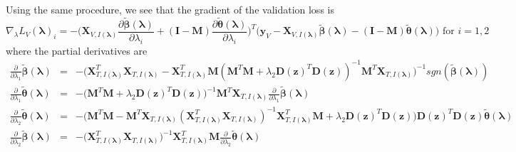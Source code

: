 \documentclass[10pt,letterpaper]{article}
\begin{document}
Using the same procedure, we see that the gradient of the validation loss is
\begin{equation*}
\nabla_\lambda L_V(\boldsymbol{\lambda})_i =
- \bigg(
\boldsymbol{X}_{V, I(\boldsymbol\lambda)} \frac{\partial \tilde{\boldsymbol\beta}(\boldsymbol{\lambda})}{\partial \lambda_i}
+ (\boldsymbol I - \boldsymbol{M}) \frac{\partial \tilde{\boldsymbol\theta}(\boldsymbol{\lambda})}{\partial \lambda_i}
\bigg )^T
\bigg (
\boldsymbol{y}_V
- \boldsymbol{X}_{V, I(\boldsymbol\lambda)} \tilde{\boldsymbol\beta}(\boldsymbol{\lambda})
- (\boldsymbol I - \boldsymbol{M}) \tilde{\boldsymbol\theta}(\boldsymbol{\lambda})
\bigg )
\text{ for } i = 1,2 
\end{equation*}
where the partial derivatives are
\begin{equation*}
\begin{array}{lcl}
\frac{\partial}{\partial \lambda_1} \tilde{\boldsymbol\beta}(\boldsymbol{\lambda})  &=&
-\bigg(\boldsymbol{X}_{T, I(\boldsymbol\lambda)}^T \boldsymbol{X}_{T, I(\boldsymbol\lambda)}
- \boldsymbol{X}_{T, I(\boldsymbol\lambda)}^T \boldsymbol{M}(\boldsymbol{M}^T \boldsymbol{M}
+ \lambda_2 \boldsymbol{D}(\boldsymbol{z})^T\boldsymbol{D}(\boldsymbol{z}))^{-1} \boldsymbol{M}^T \boldsymbol{X}_{T, I(\boldsymbol\lambda)} \bigg)^{-1} 
sgn( \tilde{\boldsymbol\beta}(\boldsymbol{\lambda})) \\
\frac{\partial }{\partial \lambda_1} \tilde{\boldsymbol\theta}(\boldsymbol{\lambda}) &=&
-\bigg(\boldsymbol{M}^T \boldsymbol{M}
+ \lambda_2 \boldsymbol{D}(\boldsymbol{z})^T \boldsymbol{D}(\boldsymbol{z})\bigg)^{-1}
\boldsymbol{M}^T \boldsymbol{X}_{T, I(\boldsymbol\lambda)} \frac{\partial}{\partial \lambda_1} \tilde{\boldsymbol\beta}(\boldsymbol{\lambda})
\\
\frac{\partial}{\partial \lambda_2}  \tilde{\boldsymbol\theta}(\boldsymbol{\lambda}) &=&
-\bigg(\boldsymbol{M}^T \boldsymbol{M}
- \boldsymbol{M}^T \boldsymbol{X}_{T, I(\boldsymbol\lambda)} (\boldsymbol{X}_{T, I(\boldsymbol\lambda)}^T\boldsymbol{X}_{T, I(\boldsymbol\lambda)})^{-1} \boldsymbol{X}_{T, I(\boldsymbol\lambda)}^T \boldsymbol{M} + \lambda_2 \boldsymbol{D}(\boldsymbol{z})^T\boldsymbol{D}(\boldsymbol{z}) \bigg)
\boldsymbol{D}(\boldsymbol{z})^T\boldsymbol{D}(\boldsymbol{z}) \tilde{\boldsymbol\theta}(\boldsymbol{\lambda})
\\
\frac{\partial}{\partial \lambda_2} \tilde{\boldsymbol\beta}(\boldsymbol{\lambda}) &=&
- \bigg( \boldsymbol{X}_{T, I(\boldsymbol\lambda)}^T\boldsymbol{X}_{T, I(\boldsymbol\lambda)}\bigg)^{-1}
\boldsymbol{X}_{T, I(\boldsymbol\lambda)}^T \boldsymbol{M}
\frac{\partial}{\partial \lambda_2}  \tilde{\boldsymbol\theta}(\boldsymbol{\lambda})\\
\end{array}
\end{equation*}
\end{document}
